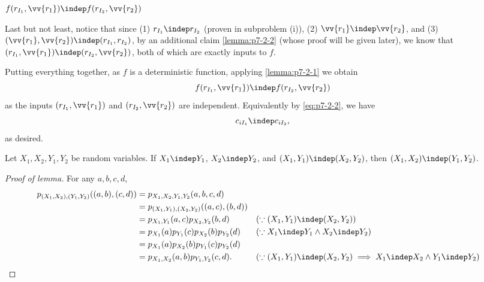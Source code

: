 \begin{answer}[ii]
    \begin{goal}
        $f(r_{I_1}, \vv{r_1}) \indep f(r_{I_2}, \vv{r_2})$
    \end{goal}
    
    Last but not least, notice that since (1) $r_{I_1} \indep r_{I_2}$ (proven in subproblem (i)), (2) $\vv{r_1} \indep \vv{r_2}$, and (3) $(\vv{r_1},\vv{r_2}) \indep (r_{I_1}, r_{I_2})$, by an additional claim \autoref{lemma:p7-2-2} (whose proof will be given later), we know that $(r_{I_1}, \vv{r_1}) \indep (r_{I_2},\vv{r_2})$, both of which are exactly inputs to $f$. 
    
    Putting everything together, as $f$ is a deterministic function, applying \autoref{lemma:p7-2-1} we obtain
    \[
        f(r_{I_1}, \vv{r_1}) \indep f(r_{I_2}, \vv{r_2})
    \]
    as the inputs $(r_{I_1}, \vv{r_1})$ and $(r_{I_2}, \vv{r_2})$ are independent. Equivalently by \eqref{eq:p7-2-2}, we have
    \[
        c_{iI_1} \indep c_{iI_2},
    \]
    as desired.

    \begin{lemma}\label{lemma:p7-2-2}
        Let $X_1,X_2,Y_1,Y_2$ be random variables. If $X_1\indep Y_1$, $X_2\indep Y_2$, and $(X_1,Y_1)\indep (X_2,Y_2)$, then  $(X_1,X_2)\indep (Y_1,Y_2)$.
    \end{lemma}
    \begin{proof}[Proof of lemma] 
        For any $a,b,c,d$,
        \vspace{-0.5cm}\begin{align*}
            p_{(X_1,X_2),(Y_1,Y_2)}((a,b),(c,d))
            &= p_{X_1,X_2,Y_1,Y_2}(a,b,c,d)\\
            &= p_{(X_1,Y_1),(X_2,Y_2)}((a,c),(b,d))\\
            &= p_{X_1,Y_1}(a,c) p_{X_2,Y_2}(b,d)
            && (\because(X_1,Y_1)\indep (X_2,Y_2) )\\
            &= p_{X_1}(a) p_{Y_1}(c) p_{X_2}(b)p_{Y_2}(d)
            && (\because X_1\indep Y_1\land X_2\indep Y_2 )\\
            &= p_{X_1}(a) p_{X_2}(b) p_{Y_1}(c)p_{Y_2}(d)\\
            &= p_{X_1,X_2}(a,b) p_{Y_1,Y_2}(c,d).
            && (\because (X_1,Y_1)\indep (X_2,Y_2) \implies X_1\indep X_2\land Y_1\indep Y_2 )
        \end{align*}
    \end{proof}
\end{answer}








